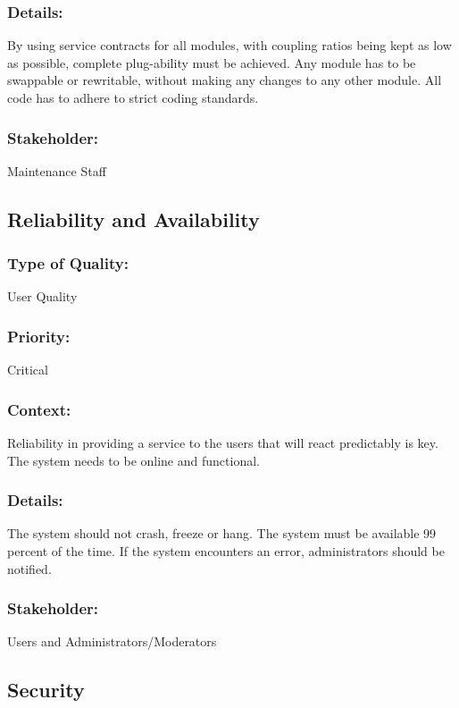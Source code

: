 \documentclass[11pt]{article}
\begin{document}
		\subsubsection{Details:}
			\textbf{}By using service contracts for all modules, with coupling ratios being kept as low as possible, complete plug-ability must be achieved. Any module has to be swappable or rewritable, without making any changes to any other module. All code has to adhere to strict coding standards.
		
		\subsubsection{Stakeholder:}
			\textbf{}Maintenance Staff

	\subsection{Reliability and Availability}
		\subsubsection{Type of Quality:}
			\textbf{}User Quality
		
		\subsubsection{Priority:}
			\textbf{} Critical

		\subsubsection{Context:}
			\textbf{}Reliability in providing a service to the users that will react predictably is key. The system needs to be online and functional.
		
		\subsubsection{Details:}
			\textbf{}The system should not crash, freeze or hang. The system must be available 99 percent of the time. If the system encounters an error, administrators should be notified.
		
		\subsubsection{Stakeholder:}
			\textbf{}Users and Administrators/Moderators

	\subsection{Security}
\end{document}
